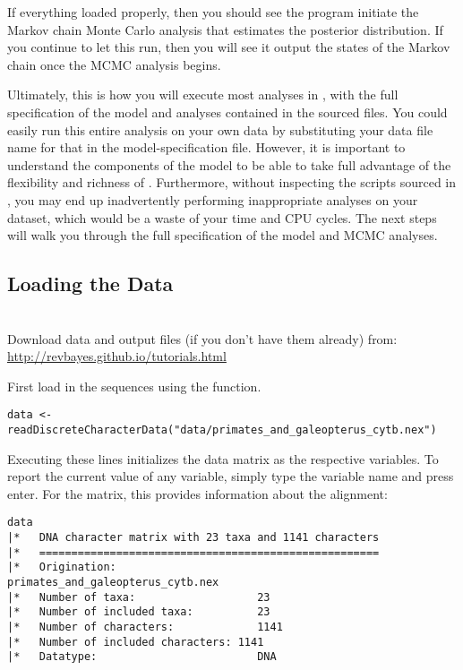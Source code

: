 If everything loaded properly, then you should see the program initiate the Markov chain Monte Carlo analysis that estimates the posterior distribution. 
If you continue to let this run, then you will see it output the states of the Markov chain once the MCMC analysis begins. 

Ultimately, this is how you will execute most analyses in \RevBayes, with the full specification of the model and analyses contained in the sourced files. 
You could easily run this entire analysis on your own data by substituting your data file name for that in the model-specification file. 
However, it is important to understand the components of the model to be able to take full advantage of the flexibility and richness of \RevBayes.
Furthermore, without inspecting the \Rev scripts sourced in , you may end up inadvertently performing inappropriate analyses on your dataset, which would be a waste of your time and CPU cycles. 
The next steps will walk you through the full specification of the model and MCMC analyses. 

\bigskip

\subsection{Loading the Data}

\noindent \\ \impmark Download data and output files (if you don't have them already) from: \\ \href{http://revbayes.github.io/tutorials.html}{http://revbayes.github.io/tutorials.html}


First load in the sequences using the  function. 
{\tt \begin{snugshade*}
\begin{lstlisting}
data <- readDiscreteCharacterData("data/primates_and_galeopterus_cytb.nex")
\end{lstlisting}
\end{snugshade*}}
Executing these lines initializes the data matrix as the respective \Rev variables. 
To report the current value of any variable, simply type the variable name and press enter. For the  matrix, this provides information about the alignment:
{\tt \begin{snugshade*}
\begin{lstlisting}
data
|*   DNA character matrix with 23 taxa and 1141 characters
|*   =====================================================
|*   Origination:                      primates_and_galeopterus_cytb.nex
|*   Number of taxa:                   23
|*   Number of included taxa:          23
|*   Number of characters:             1141
|*   Number of included characters: 1141
|*   Datatype:                         DNA
\end{lstlisting}
\end{snugshade*}}


